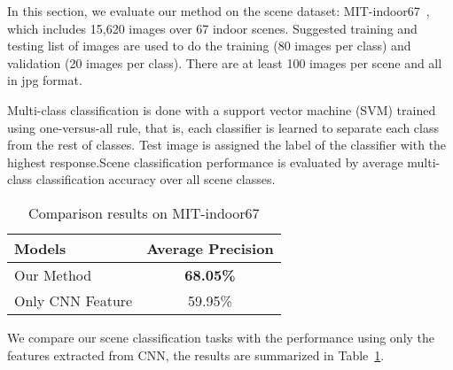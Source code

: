 
In this section, we evaluate our method on the scene dataset:
MIT-indoor67~\cite{Quattoni:2009:RIS},
which includes 15,620 images over 67 indoor scenes. Suggested training and
testing list of images are used to do the training (80 images per class)
and validation (20 images per class). There are at least 100 images per
scene and all in jpg format.

Multi-class classification is done with a support vector machine (SVM) trained
using one-versus-all rule, that is, each classifier is learned to separate each
class from the rest of classes. Test image is assigned the label of the
classifier with the highest response.Scene classification performance is
evaluated by average multi-class classification accuracy over all scene classes.

\begin{table}[ht]
	\caption{Comparison results on MIT-indoor67}
	\centering
	\begin{tabular}{l c}
	\hline \hline
	Models 			 & Average Precision \\ \hline
	Our Method  	 & {\bf{68.05\%}} \\
	Only CNN Feature & 59.95\%	\\
	\hline
	\end{tabular}
	\label{tab:overall}
\end{table}

We compare our scene classification tasks with the performance using only the
features extracted from CNN, the results are summarized in Table~\ref{tab:overall}.



